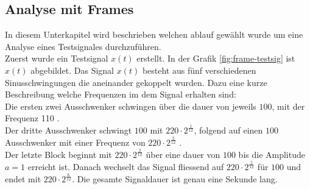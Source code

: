 \subsection{Analyse mit Frames}
In diesem Unterkapitel wird beschrieben welchen ablauf gewählt wurde um eine Analyse eines Testsignales durchzuführen.\\
Zuerst wurde ein Testsignal $x(t)$ erstellt. In der Grafik \ref{fig:frame-testsig} ist $x(t)$ abgebildet. Das Signal $x(t)$ besteht aus fünf verschiedenen Sinusschwingungen die aneinander gekoppelt wurden. Dazu eine kurze Beschreibung welche Frequenzen im dem Signal erhalten sind:\\
Die ersten zwei Ausschwenker schwingen über die dauer von jeweils $100$, mit der Frequenz 110 \text{[Hz]}. \\
Der dritte Ausschwenker schwingt $100$\text{[ms]} mit $220\cdot 2^{\frac{1}{12}}$\text{[Hz]}, folgend auf einen $100$\text{[ms]} Ausschwenker mit einer Frequenz von $220\cdot 2^{\frac{2}{12}}$ \text{[Hz]}. \\
Der letzte Block beginnt mit $220\cdot 2^{\frac{2}{12}}$\text{[Hz]} über eine dauer von $100$\text{[ms]} bis die Amplitude $a=1$ erreicht ist. Danach wechselt das Signal fliessend auf $220\cdot 2^{\frac{5}{12}}$\text{[Hz]} für $100$\text{[ms]} und endet mit $220\cdot 2^{\frac{6}{12}}$\text{[Hz]}. Die gesamte Signaldauer ist genau eine Sekunde lang. \\



